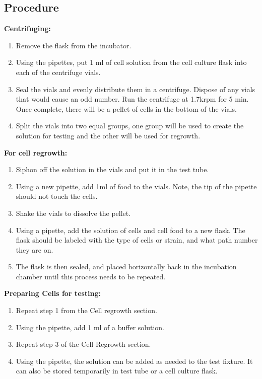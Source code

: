 \documentclass[journal]{IEEEtran}
\begin{document}
\subsection{Procedure}

\textbf{Centrifuging:}
\begin{enumerate}
\item Remove the flask from the incubator.
\item Using the pipettes, put 1 ml of cell solution from the cell culture flask into each of the centrifuge vials.
\item Seal the vials and evenly distribute them in a centrifuge. Dispose of any vials that would cause an odd number. Run the centrifuge at 1.7krpm for 5 min. Once complete, there will be a pellet of cells in the bottom of the vials.
\item Split the vials into two equal groups, one group will be used to create the solution for testing and the other will be used for regrowth.
\end{enumerate}

\textbf{For cell regrowth:}
\begin{enumerate}
\item Siphon off the solution in the vials and put it in the test tube. 
\item Using a new pipette, add 1ml of food to the vials. Note, the tip of the pipette should not touch the cells.
\item Shake the vials to dissolve the pellet.
\item Using a pipette, add the solution of cells and cell food to a new flask. The flask should be labeled with the type of cells or strain, and what path number they are on.
\item The flask is then sealed, and placed horizontally back in the incubation chamber until this process needs to be repeated.
\end{enumerate}

\textbf{Preparing Cells for testing:}
\begin{enumerate}
\item Repeat step 1 from the Cell regrowth section.
\item Using the pipette, add 1 ml of a buffer solution.
\item Repeat step 3 of the Cell Regrowth section.
\item Using the pipette, the solution can be added as needed to the test fixture. It can also be stored temporarily in test tube or a cell culture flask.
\end{enumerate}
\end{document}
